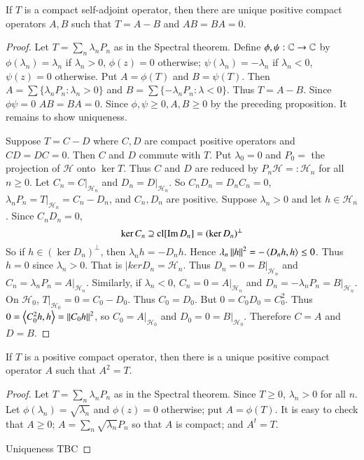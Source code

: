 \begin{thm}
    If $T$ is a compact self-adjoint operator, then there are unique positive compact operators $A,B$ such that $T = A-B$ and $AB = BA = 0$.
\end{thm}
\begin{proof}
    Let $T = \sum_n\lambda_nP_n$ as in the Spectral theorem. Define $\phi,\psi:\mathbb C\rightarrow \mathbb C$ by $\phi(\lambda_n) = \lambda_n$ if $\lambda_n > 0$, $\phi(z) = 0$ otherwise; $\psi(\lambda_n) = -\lambda_n$ if $\lambda_n < 0$, $\psi(z) = 0$ otherwise. Put $A = \phi(T)$ and $B = \psi(T)$. Then $A = \sum\{\lambda_nP_n:\lambda_n > 0\}$ and $B = \sum\{-\lambda_nP_n:\lambda < 0\}$. Thus $T = A-B$. Since $\phi\psi = 0$ $AB = BA = 0$. Since $\phi,\psi \geq 0, A,B \geq 0$ by the preceding proposition. It remains to show uniqueness.

    Suppose $T = C-D$ where $C,D$ are compact positive operators and $CD =DC = 0$. Then $C$ and $D$ commute with $T$. Put $\lambda_0 = 0$ and $P_0 = $ the projection of $\mathscr{H}$ onto $\ker T$. Thus $C$ and $D$ are reduced by $P_n\mathscr{H} =: \mathscr{H}_n$ for all $n \geq 0$. Let $C_n = C\vert_{\mathscr{H}_n}$ and $D_n = D\vert_{\mathscr{H}_n}$. So $C_nD_n = D_nC_n = 0$, $\lambda_nP_n = T\vert_{\mathscr{H}_n} = C_n-D_n$, and $C_n,D_n$ are positive. Suppose $\lambda_n > 0$ and let $h \in \mathscr{H}_n$. Since $C_nD_n = 0$, $$\ker C_n \supseteq \text{cl}[\operatorname{Im} D_n] = (\ker D_n)^{\perp}$$
    So if $h \in (\ker D_n)^{\perp}$, then $\lambda_nh = -D_nh$. Hence $\lambda_n\left|\left| h\right|\right|^2 = -\left\langle D_nh,h\right\rangle \leq 0$. Thus $h = 0$ since $\lambda_n > 0$. That is $|ker D_n = \mathscr{H}_n$. Thus $D_n = 0 = B\vert_{\mathscr{H}_n}$ and $C_n = \lambda_nP_n = A\vert_{\mathscr{H}_n}$. Similarly, if $\lambda_n < 0$, $C_n = 0 = A\vert_{\mathscr{H}_n}$ and $D_n = -\lambda_nP_n = B\vert_{\mathscr{H}_n}$. On $\mathscr{H}_0$, $T\vert_{\mathscr{H}_0} = 0 = C_0-D_0$. Thus $C_0 = D_0$. But $0 = C_0D_0 = C_0^2$. Thus $0 = \left\langle C_0^2h,h\right\rangle = \left|\left| C_0h\right|\right|^2$, so $C_0 = A\vert_{\mathscr{H}_0}$ and $D_0 = 0 = B\vert_{\mathscr{H}_0}$. Therefore $C = A$ and $D = B$.
\end{proof}

\begin{thm}
    If $T$ is a positive compact operator, then there is a unique positive compact operator $A$ such that $A^2 = T$.
\end{thm}
\begin{proof}
    Let $T = \sum_n\lambda_nP_n$ as in the Spectral theorem. Since $T \geq 0$, $\lambda_n > 0$ for all $n$. Let $\phi(\lambda_n) = \sqrt{\lambda_n}$ and $\phi(z) = 0$ otherwise; put $A = \phi(T)$. It is easy to check that $A \geq 0$; $A = \sum_n \sqrt{\lambda_n}P_n$ so that $A$ is compact; and $A^t = T$.

    Uniqueness TBC
\end{proof}


